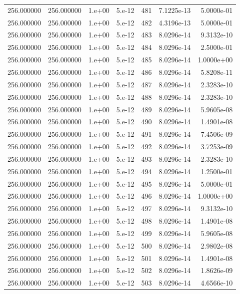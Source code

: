 \begin{table}[htbp]
\begin{tabular}{rrrrrrr}
256.000000 & 256.000000 & 1.e+00 & 5.e-12 & 481 & 7.1225e-13 & 5.0000e-01 \\
256.000000 & 256.000000 & 1.e+00 & 5.e-12 & 482 & 4.3196e-13 & 5.0000e-01 \\
256.000000 & 256.000000 & 1.e+00 & 5.e-12 & 483 & 8.0296e-14 & 9.3132e-10 \\
256.000000 & 256.000000 & 1.e+00 & 5.e-12 & 484 & 8.0296e-14 & 2.5000e-01 \\
256.000000 & 256.000000 & 1.e+00 & 5.e-12 & 485 & 8.0296e-14 & 1.0000e+00 \\
256.000000 & 256.000000 & 1.e+00 & 5.e-12 & 486 & 8.0296e-14 & 5.8208e-11 \\
256.000000 & 256.000000 & 1.e+00 & 5.e-12 & 487 & 8.0296e-14 & 2.3283e-10 \\
256.000000 & 256.000000 & 1.e+00 & 5.e-12 & 488 & 8.0296e-14 & 2.3283e-10 \\
256.000000 & 256.000000 & 1.e+00 & 5.e-12 & 489 & 8.0296e-14 & 5.9605e-08 \\
256.000000 & 256.000000 & 1.e+00 & 5.e-12 & 490 & 8.0296e-14 & 1.4901e-08 \\
256.000000 & 256.000000 & 1.e+00 & 5.e-12 & 491 & 8.0296e-14 & 7.4506e-09 \\
256.000000 & 256.000000 & 1.e+00 & 5.e-12 & 492 & 8.0296e-14 & 3.7253e-09 \\
256.000000 & 256.000000 & 1.e+00 & 5.e-12 & 493 & 8.0296e-14 & 2.3283e-10 \\
256.000000 & 256.000000 & 1.e+00 & 5.e-12 & 494 & 8.0296e-14 & 1.2500e-01 \\
256.000000 & 256.000000 & 1.e+00 & 5.e-12 & 495 & 8.0296e-14 & 5.0000e-01 \\
256.000000 & 256.000000 & 1.e+00 & 5.e-12 & 496 & 8.0296e-14 & 1.0000e+00 \\
256.000000 & 256.000000 & 1.e+00 & 5.e-12 & 497 & 8.0296e-14 & 9.3132e-10 \\
256.000000 & 256.000000 & 1.e+00 & 5.e-12 & 498 & 8.0296e-14 & 1.4901e-08 \\
256.000000 & 256.000000 & 1.e+00 & 5.e-12 & 499 & 8.0296e-14 & 5.9605e-08 \\
256.000000 & 256.000000 & 1.e+00 & 5.e-12 & 500 & 8.0296e-14 & 2.9802e-08 \\
256.000000 & 256.000000 & 1.e+00 & 5.e-12 & 501 & 8.0296e-14 & 1.4901e-08 \\
256.000000 & 256.000000 & 1.e+00 & 5.e-12 & 502 & 8.0296e-14 & 1.8626e-09 \\
256.000000 & 256.000000 & 1.e+00 & 5.e-12 & 503 & 8.0296e-14 & 4.6566e-10 \\

\end{tabular}
\end{table}
